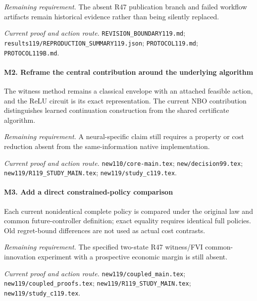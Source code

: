 \par\emph{Remaining requirement.} The absent R47 publication branch and failed workflow artifacts remain historical evidence rather than being silently replaced.

\par\emph{Current proof and action route.} \nolinkurl{REVISION_BOUNDARY119.md}; \nolinkurl{results119/REPRODUCTION_SUMMARY119.json}; \nolinkurl{PROTOCOL119.md}; \nolinkurl{PROTOCOL119B.md}.

\paragraph{M2. Reframe the central contribution around the underlying algorithm}

The witness method remains a classical envelope with an attached feasible action, and the ReLU circuit is its exact representation. The current NBO contribution distinguishes learned continuation construction from the shared certificate algorithm.

\par\emph{Remaining requirement.} A neural-specific claim still requires a property or cost reduction absent from the same-information native implementation.

\par\emph{Current proof and action route.} \nolinkurl{new110/core-main.tex}; \nolinkurl{new/decision99.tex}; \nolinkurl{new119/R119_STUDY_MAIN.tex}; \nolinkurl{new119/study_c119.tex}.

\paragraph{M3. Add a direct constrained-policy comparison}

Each current nonidentical complete policy is compared under the original law and common future-controller definition; exact equality requires identical full policies. Old regret-bound differences are not used as actual cost contrasts.

\par\emph{Remaining requirement.} The specified two-state R47 witness/\allowbreak{}FVI common-innovation experiment with a prospective economic margin is still absent.

\par\emph{Current proof and action route.} \nolinkurl{new119/coupled_main.tex}; \nolinkurl{new119/coupled_proofs.tex}; \nolinkurl{new119/R119_STUDY_MAIN.tex}; \nolinkurl{new119/study_c119.tex}.

